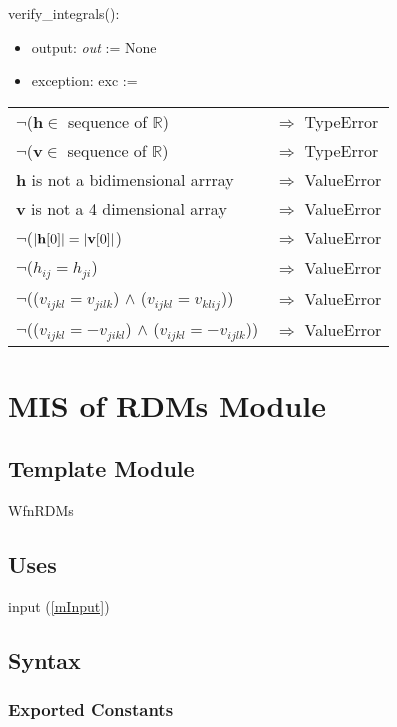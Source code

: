 \documentclass[12pt, titlepage]{article}
\begin{document}
\noindent verify\_integrals():
\begin{itemize}
	\item output: \textit{out} := None
	\item exception: exc := 
\end{itemize}
\noindent \begin{longtable*}[l]{l l}
	$\neg$(\textbf{h}$\in$ sequence of $\mathbb{R}$) & $\Rightarrow$ TypeError\\
	$\neg$(\textbf{v}$\in$ sequence of $\mathbb{R}$) & $\Rightarrow$ 
	TypeError\\
	\textbf{h} is not a bidimensional arrray  & $\Rightarrow$ ValueError\\
	\textbf{v} is not a 4 dimensional array& $\Rightarrow$ ValueError\\
	$\neg$($|\bold{h}[0]| = |\bold{v}[0]|$) & $\Rightarrow$ 
	ValueError\\
	$\neg$($h_{ij} = h_{ji}$) & $\Rightarrow$ 
	ValueError\\
	$\neg$(($v_{ijkl} = v_{jilk}$) $\land$ ($v_{ijkl} = v_{klij}$)) & 
	$\Rightarrow$ 
	ValueError\\
	$\neg$(($v_{ijkl} = -v_{jikl}$) $\land$ ($v_{ijkl} = -v_{ijlk}$)) & 
	$\Rightarrow$ 
	ValueError\\
\end{longtable*}

\newpage

\section{MIS of RDMs Module} \label{mRDMs}

\subsection{Template Module}

WfnRDMs

\subsection{Uses}
input (\ref{mInput})

\subsection{Syntax}

\subsubsection{Exported Constants}
\end{document}
